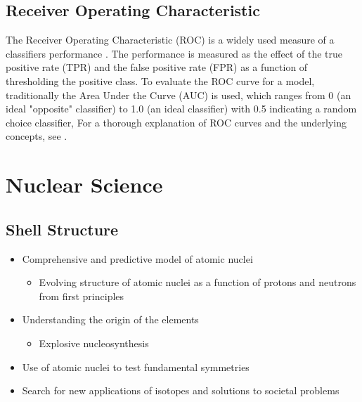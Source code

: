 \subsection{Receiver Operating Characteristic}
The Receiver Operating Characteristic (ROC) is a widely used measure of a
classifiers performance . The performance is measured as the effect
of the true positive rate (TPR) and the false positive rate (FPR) as a function
of thresholding the positive class. To evaluate the ROC curve for a model,
traditionally the Area Under the Curve (AUC) is used, which ranges from 0
(an ideal "opposite" classifier) to 1.0 (an ideal classifier) with 0.5
indicating a random choice classifier,
For a thorough explanation of ROC curves and the underlying concepts, see \cite{Fawcett2006}.

\section{Nuclear Science}
\subsection{Shell Structure}
\begin{itemize}
	\item Comprehensive and predictive model of atomic nuclei
	\begin{itemize}
		\item Evolving structure of atomic nuclei as a function of protons and neutrons from first principles
	\end{itemize}
	\item Understanding the origin of the elements
	\begin{itemize}
		\item Explosive nucleosynthesis
	\end{itemize}
	\item Use of atomic nuclei to test fundamental symmetries
	\item Search for new applications of isotopes and solutions to societal problems
\end{itemize}

